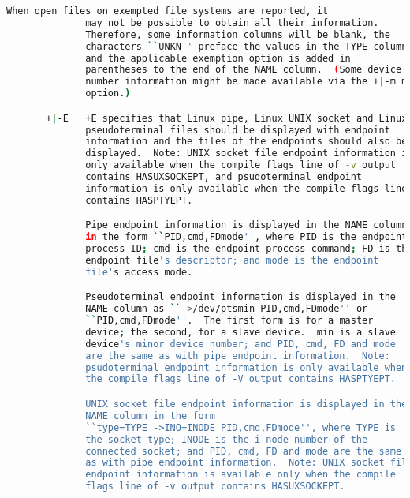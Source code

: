 {{\begin{lstlisting}[language=bash]
              When open files on exempted file systems are reported, it
              may not be possible to obtain all their information.
              Therefore, some information columns will be blank, the
              characters ``UNKN'' preface the values in the TYPE column,
              and the applicable exemption option is added in
              parentheses to the end of the NAME column.  (Some device
              number information might be made available via the +|-m m
              option.)

       +|-E   +E specifies that Linux pipe, Linux UNIX socket and Linux
              pseudoterminal files should be displayed with endpoint
              information and the files of the endpoints should also be
              displayed.  Note: UNIX socket file endpoint information is
              only available when the compile flags line of -v output
              contains HASUXSOCKEPT, and psudoterminal endpoint
              information is only available when the compile flags line
              contains HASPTYEPT.

              Pipe endpoint information is displayed in the NAME column
              in the form ``PID,cmd,FDmode'', where PID is the endpoint
              process ID; cmd is the endpoint process command; FD is the
              endpoint file's descriptor; and mode is the endpoint
              file's access mode.

              Pseudoterminal endpoint information is displayed in the
              NAME column as ``->/dev/ptsmin PID,cmd,FDmode'' or
              ``PID,cmd,FDmode''.  The first form is for a master
              device; the second, for a slave device.  min is a slave
              device's minor device number; and PID, cmd, FD and mode
              are the same as with pipe endpoint information.  Note:
              psudoterminal endpoint information is only available when
              the compile flags line of -V output contains HASPTYEPT.

              UNIX socket file endpoint information is displayed in the
              NAME column in the form
              ``type=TYPE ->INO=INODE PID,cmd,FDmode'', where TYPE is
              the socket type; INODE is the i-node number of the
              connected socket; and PID, cmd, FD and mode are the same
              as with pipe endpoint information.  Note: UNIX socket file
              endpoint information is available only when the compile
              flags line of -v output contains HASUXSOCKEPT.


\end{lstlisting}}}
